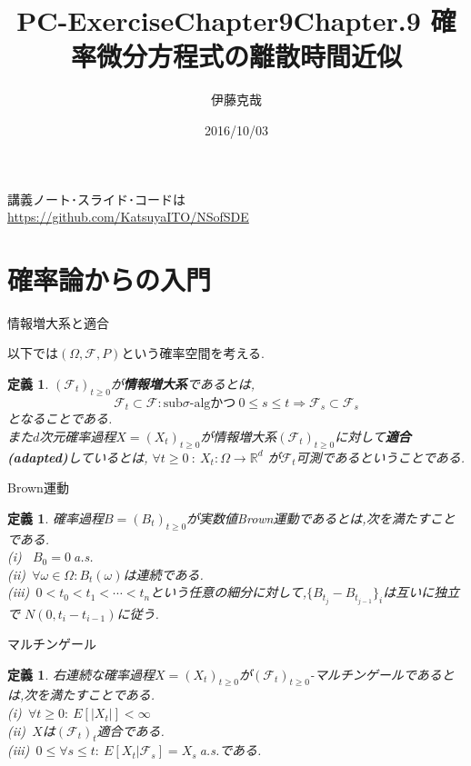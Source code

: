 \documentclass[dvipdfmx,cjk]{beamer}
\title{PC-ExerciseChapter9}
\numberwithin{equation}{section}
\newtheorem{Def}     [Thm]{定義}
\def\R{\mathbb R}
\def\F{\mathcal F}
\def\defb{\begin{Def}}
\def\defx{\end{Def}}
\begin{document}
\title[Chap8]{Chapter.9 確率微分方程式の離散時間近似} 
\author[Katsuya ITO]{伊藤克哉} 
\date{2016/10/03}

\begin{frame}
\titlepage    
\end{frame}
\begin{frame}
講義ノート･スライド･コードは\\
\url{https://github.com/KatsuyaITO/NSofSDE}
\end{frame}
\begin{frame}
\tableofcontents
\end{frame}


\section{確率論からの入門}
\begin{frame}{情報増大系と適合}

以下では$(\Omega,\F,P)$という確率空間を考える.
\defb
$(\F_t)_{t\ge0}$が{\bf 情報増大系}であるとは,
\[
\F_t \subset \F : \mbox{sub}\sigma\mbox{-algかつ}\  0\le s \le t \Rightarrow \F_s \subset \F_s
\]
となることである.\\
また$d$次元確率過程$X=(X_t)_{t\ge 0}$が情報増大系$(\F_t)_{t\ge0}$に対して{\bf 適合(adapted)}しているとは,
$\forall t \ge 0 \ : \ X_t:\Omega \to \R^d$ が$\F_t$可測であるということである.
\defx

\end{frame}

\begin{frame}{Brown運動}
\defb
確率過程$B=(B_t)_{t\ge 0}$が実数値Brown運動であるとは,次を満たすことである.\\
(i) \ $B_0 = 0 \  $a.s.\\
(ii)\ $\forall \omega \in \Omega:B_t(\omega)$は連続である.\\
(iii)\ $0 < t_0 < t_1 < \cdots < t_n $という任意の細分に対して,$\{B_{t_j} - B_{t_{j-1}}\}_{i}$は互いに独立で
$N(0,t_i-t_{i-1})$に従う.
\defx
\end{frame}

\begin{frame}{マルチンゲール}
\defb
右連続な確率過程$X=(X_t)_{t\ge 0}$が$(\F_t)_{t\ge 0}$-マルチンゲールであるとは,次を満たすことである.\\
(i)\ $\forall t \ge 0:\ E[|X_t|] < \infty$\\
(ii)\ $X$は$(\F_t)_t$適合である.\\
(iii)\ $0\le \forall s \le t:\ E[X_t|\F_s] = X_s\ $a.s.である.
\defx

\end{frame}
\end{document}
